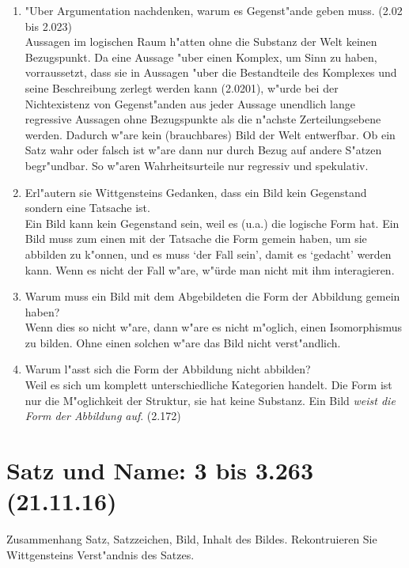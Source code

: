 \documentclass[]{scrartcl}
\begin{document}
\begin{enumerate}
  \item {\color{NavyBlue}"Uber Argumentation nachdenken, warum es Gegenst"ande geben muss. (2.02 bis 2.023)}\\
{\color{ForestGreen} Aussagen im logischen Raum h"atten ohne die Substanz der Welt keinen Bezugspunkt. Da eine Aussage "uber einen Komplex, um Sinn zu haben, vorraussetzt, dass sie in Aussagen "uber die Bestandteile des Komplexes und seine Beschreibung zerlegt werden kann (2.0201), w"urde bei der Nichtexistenz von Gegenst"anden aus jeder Aussage unendlich lange regressive Aussagen ohne Bezugspunkte als die n"achste Zerteilungsebene werden. Dadurch w"are kein (brauchbares) Bild der Welt entwerfbar. Ob ein Satz wahr oder falsch ist w"are dann nur durch Bezug auf andere S"atzen begr"undbar. So w"aren Wahrheitsurteile nur regressiv und spekulativ.}
  \item {\color{NavyBlue}Erl"autern sie Wittgensteins Gedanken, dass ein Bild kein Gegenstand sondern eine Tatsache ist.}\\
{\color{ForestGreen} Ein Bild kann kein Gegenstand sein, weil es (u.a.) die logische Form hat. Ein Bild muss zum einen mit der Tatsache die Form gemein haben, um sie abbilden zu k"onnen, und es muss `der Fall sein', damit es `gedacht' werden kann. Wenn es nicht der Fall w"are, w"ürde man nicht mit ihm interagieren.}
  \item {\color{NavyBlue} Warum muss ein Bild mit dem Abgebildeten die Form der Abbildung gemein haben?}\\
{\color{ForestGreen}Wenn dies so nicht w"are, dann w"are es nicht m"oglich, einen Isomorphismus zu bilden. Ohne einen solchen w"are das Bild nicht verst"andlich.}
  \item {\color{NavyBlue}Warum l"asst sich die Form der Abbildung nicht abbilden?}\\
{\color{ForestGreen} Weil es sich um komplett unterschiedliche Kategorien handelt. Die Form ist nur die M"oglichkeit der Struktur, sie hat keine Substanz. Ein Bild \emph{weist die Form der Abbildung auf}. (2.172)}

\end{enumerate}


\section{Satz und Name: 3 bis 3.263\\(21.11.16)}

Zusammenhang Satz, Satzzeichen, Bild, Inhalt des Bildes.
Rekontruieren Sie Wittgensteins Verst"andnis des Satzes.
\end{document}
